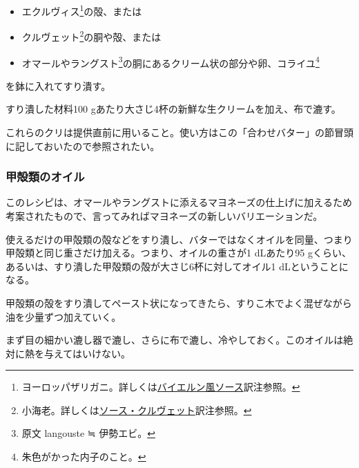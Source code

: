 \begin{recette}


\begin{itemize}
\item
  エクルヴィス\footnote{ヨーロッパザリガニ。詳しくは\protect\hyperlink{sauce-bavaroise}{バイエルン風ソース}訳注参照。}の殻、または
\item
  クルヴェット\footnote{小海老。詳しくは\protect\hyperlink{sauce-aux-crevettes}{ソース・クルヴェット}訳注参照。}の胴や殻、または
\item
  オマールやラングスト\footnote{原文 langouste ≒ 伊勢エビ。}の胴にあるクリーム状の部分や卵、コライユ\footnote{朱色がかった内子のこと。}
\end{itemize}

を鉢に入れてすり潰す。

すり潰した材料100 gあたり大さじ4杯の新鮮な生クリームを加え、布で漉す。

これらのクリは提供直前に用いること。使い方はこの「合わせバター」の節冒頭に記しておいたので参照されたい。

\hypertarget{huile-de-crustaces}{%
\subsubsection{甲殻類のオイル}\label{huile-de-crustaces}}



このレシピは、オマールやラングストに添えるマヨネーズの仕上げに加えるため考案されたもので、言ってみればマヨネーズの新しいバリエーションだ。

使えるだけの甲殻類の殻などをすり潰し、バターではなくオイルを同量、つまり甲殻類と同じ重さだけ加える。つまり、オイルの重さが1
dLあたり95
gくらい、あるいは、すり潰した甲殻類の殻が大さじ6杯に対してオイル1
dLということになる。

甲殻類の殻をすり潰してペースト状になってきたら、すりこ木でよく混ぜながら油を少量ずつ加えていく。

まず目の細かい漉し器で漉し、さらに布で漉し、冷やしておく。このオイルは絶対に熱を与えてはいけない。
\end{recette}
